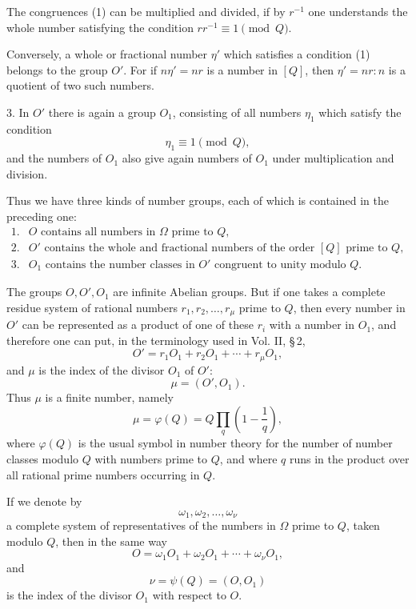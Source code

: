 \documentclass[11pt]{article}
\begin{document}
The congruences (1) can be multiplied and divided, if by $r^{-1}$ one understands the whole number satisfying the condition $rr^{-1}\equiv1\pmod Q$.

Conversely, a whole or fractional number $\eta'$ which satisfies a condition (1) belongs to the group $O'$. For if $n\eta'=nr$ is a number in $[Q]$, then $\eta'=nr:n$ is a quotient of two such numbers.

3. In $O'$ there is again a group $O_1$, consisting of all numbers $\eta_1$ which satisfy the condition
\begin{equation}
 \eta_1\equiv1\pmod Q,
\tag{2}
\end{equation}
and the numbers of $O_1$ also give again numbers of $O_1$ under multiplication and division.

Thus we have three kinds of number groups, each of which is contained in the preceding one:
\[
\begin{array}{ll}
1.& O \text{ contains all numbers in }\Omega\text{ prime to }Q,\\
2.& O' \text{ contains the whole and fractional numbers of the order }[Q]\text{ prime to }Q,\\
3.& O_1 \text{ contains the number classes in }O'\text{ congruent to unity modulo }Q.
\end{array}
\]

The groups $O,O',O_1$ are infinite Abelian groups. But if one takes a complete residue system of rational numbers $r_1,r_2,\ldots,r_\mu$ prime to $Q$, then every number in $O'$ can be represented as a product of one of these $r_i$ with a number in $O_1$, and therefore one can put, in the terminology used in Vol. II, \S\,2,
\begin{equation}
 O'=r_1O_1+r_2O_1+\cdots+r_\mu O_1,
\tag{3}
\end{equation}
and $\mu$ is the index of the divisor $O_1$ of $O'$:
\begin{equation}
 \mu=(O',O_1).
\tag{4}
\end{equation}
Thus $\mu$ is a finite number, namely
\begin{equation}
 \mu=\varphi(Q)=Q\prod_q\left(1-\frac1q\right),
\tag{5}
\end{equation}
where $\varphi(Q)$ is the usual symbol in number theory for the number of number classes modulo $Q$ with numbers prime to $Q$, and where $q$ runs in the product over all rational prime numbers occurring in $Q$.

If we denote by
\[
 \omega_1,\omega_2,\ldots,\omega_\nu
\]
a complete system of representatives of the numbers in $\Omega$ prime to $Q$, taken modulo $Q$, then in the same way
\begin{equation}
 O=\omega_1O_1+\omega_2O_1+\cdots+\omega_\nu O_1,
\tag{6}
\end{equation}
and
\begin{equation}
 \nu=\psi(Q)=(O,O_1)
\tag{7}
\end{equation}
is the index of the divisor $O_1$ with respect to $O$.
\end{document}
